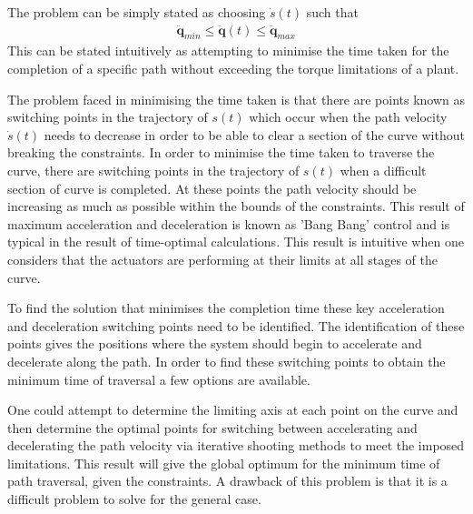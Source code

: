 The problem can be simply stated as choosing $\dot{s}(t)$ such that 
\begin{align*}
\ddot{\textbf{q}}_{min} \leq \ddot{\textbf{q}}(t) \leq \ddot{\textbf{q}}_{max}
\end{align*} 
This can be stated intuitively as attempting to minimise the time taken for the completion of a specific path without exceeding the torque limitations of a plant.

The problem faced in minimising the time taken is that there are points known as switching points in the trajectory of $s(t)$ which occur when the path velocity $\dot{s}(t)$ needs to decrease in order to be able to clear a section of the curve without breaking the constraints. In order to minimise the time taken to traverse the curve, there are switching points in the trajectory of $s(t)$ when a difficult section of curve is completed. At these points the path velocity should be increasing as much as possible within the bounds of the constraints. This result of maximum acceleration and deceleration is known as 'Bang Bang' control and is typical in the result of time-optimal calculations. This result is intuitive when one considers that the actuators are performing at their limits at all stages of the curve.
 
To find the solution that minimises the completion time these key acceleration and deceleration switching points need to be identified. The identification of these points gives the positions where the system should begin to accelerate and decelerate along the path.
In order to find these switching points to obtain the minimum time of traversal a few options are available.

One could attempt to determine the limiting axis at each point on the curve and then determine the optimal points for switching between accelerating and decelerating the path velocity via iterative shooting methods to meet the imposed limitations. This result will give the global optimum for the minimum time of path traversal, given the constraints. A drawback of this problem is that it is a difficult problem to solve for the general case.

